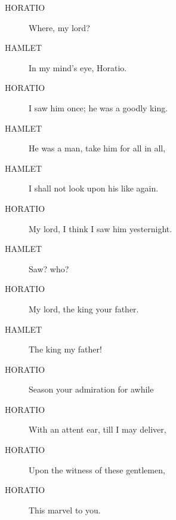 \documentclass{article}
\begin{document}
\begin{description}
            
\item[HORATIO] Where, my lord?
\end{description}
          
\begin{description}
            
\item[HAMLET] In my mind's eye, Horatio.
\end{description}
          
\begin{description}
            
\item[HORATIO] I saw him once; he was a goodly king.
\end{description}
          
\begin{description}
            
\item[HAMLET] He was a man, take him for all in all,
\item[HAMLET] I shall not look upon his like again.
\end{description}
          
\begin{description}
            
\item[HORATIO] My lord, I think I saw him yesternight.
\end{description}
          
\begin{description}
            
\item[HAMLET] Saw? who?
\end{description}
          
\begin{description}
            
\item[HORATIO] My lord, the king your father.
\end{description}
          
\begin{description}
            
\item[HAMLET] The king my father!
\end{description}
          
\begin{description}
            
\item[HORATIO] Season your admiration for awhile
\item[HORATIO] With an attent ear, till I may deliver,
\item[HORATIO] Upon the witness of these gentlemen,
\item[HORATIO] This marvel to you.
\end{description}
          
\end{document}
